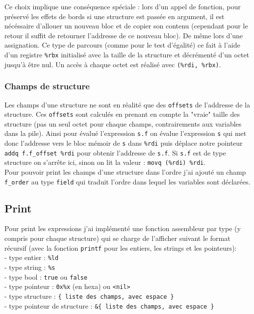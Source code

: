 \documentclass[9pt,a4paper]{article}
\begin{document}
Ce choix implique une conséquence spéciale : lors d'un appel de fonction, pour préservé les effets de bords si une structure est passée en argument, il est nécéssaire d'allouer un nouveau bloc et de copier son contenu (cependant pour le retour il suffit de retourner l'addresse de ce nouveau bloc). De même lors d'une assignation. Ce type de parcours (comme pour le test d'égalité) ce fait à l'aide d'un registre \verb|%rbx| initialisé avec la taille de la structure et décrémenté d'un octet jusqu'à être nul. Un accès à chaque octet est réalisé avec \verb|(%rdi, %rbx)|.

\subsubsection*{Champs de structure}

Les champs d'une structure ne sont en réalité que des \verb|offsets| de l'addresse de la structure. Ces \verb|offsets| sont calculés en prenant en compte la "vraie" taille des structure (pas un seul octet pour chaque champs, contrairements aux variables dans la pile). Ainsi pour évalué l'expression \verb|s.f| on évalue l'expression \verb|s| qui met donc l'addresse vers le bloc mémoir de \verb|s| dans \verb|%rdi| puis déplace notre pointeur \verb|addq f.f_offset %rdi| pour obtenir l'addresse de \verb|s.f|. Si \verb|s.f| est de type structure on s'arrête ici, sinon on lit la valeur : \verb|movq (%rdi) %rdi|.
\\

Pour pouvoir print les champs d'une structure dans l'ordre j'ai ajouté un champ \verb|f_order| au type \verb|field| qui traduit l'ordre dans lequel les variables sont déclarées.

\subsection{Print}

Pour print les expressions j'ai implémenté une fonction assembleur par type (y compris pour chaque structure) qui se charge de l'afficher suivant le format récursif (avec la fonction \verb|printf| pour les entiers, les strings et les pointeurs): \\
 - type entier : \verb|%ld| \\
 - type string : \verb|%s| \\
 - type bool : \verb|true| ou \verb|false| \\
 - type pointeur : \verb|0x%x| (en hexa) ou \verb|<nil>| \\
 - type structure : \verb|{ liste des champs, avec espace }| \\
 - type pointeur de structure : \verb|&{ liste des champs, avec espace }| \\
\end{document}
